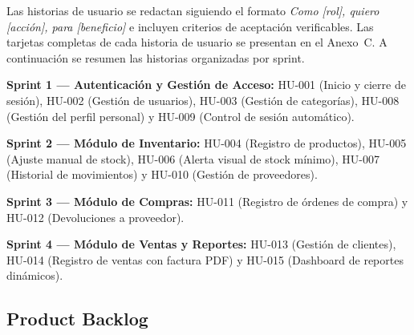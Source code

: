 \documentclass[12pt, letterpaper]{report}
\begin{document}
Las historias de usuario se redactan siguiendo el formato \textit{Como [rol], quiero [acción], para [beneficio]} e incluyen criterios de aceptación verificables. Las tarjetas completas de cada historia de usuario se presentan en el Anexo~C. A continuación se resumen las historias organizadas por sprint.

\textbf{Sprint 1 — Autenticación y Gestión de Acceso:} HU-001 (Inicio y cierre de sesión), HU-002 (Gestión de usuarios), HU-003 (Gestión de categorías), HU-008 (Gestión del perfil personal) y HU-009 (Control de sesión automático).

\textbf{Sprint 2 — Módulo de Inventario:} HU-004 (Registro de productos), HU-005 (Ajuste manual de stock), HU-006 (Alerta visual de stock mínimo), HU-007 (Historial de movimientos) y HU-010 (Gestión de proveedores).

\textbf{Sprint 3 — Módulo de Compras:} HU-011 (Registro de órdenes de compra) y HU-012 (Devoluciones a proveedor).

\textbf{Sprint 4 — Módulo de Ventas y Reportes:} HU-013 (Gestión de clientes), HU-014 (Registro de ventas con factura PDF) y HU-015 (Dashboard de reportes dinámicos).

\subsection{Product Backlog}
\end{document}
